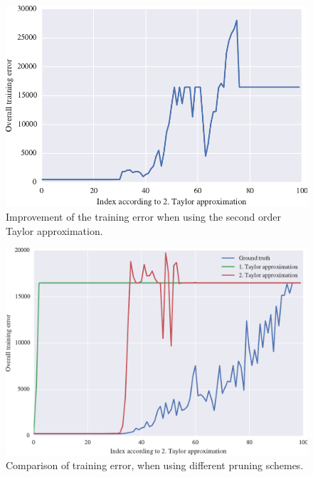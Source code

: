 \begin{figure}
\centering
\includegraphics[width=0.6\linewidth]{improvement3.pdf}
\caption{Improvement of the training error when using the second order Taylor approximation.}
\label{fig:improvement3}
\end{figure}

\begin{figure}
\centering
\includegraphics[width=0.6\linewidth]{greedy_algo_comparison.pdf}
\caption{Comparison of training error, when using different pruning schemes.}
\label{fig:greedy_algo_comparison}
\end{figure}
